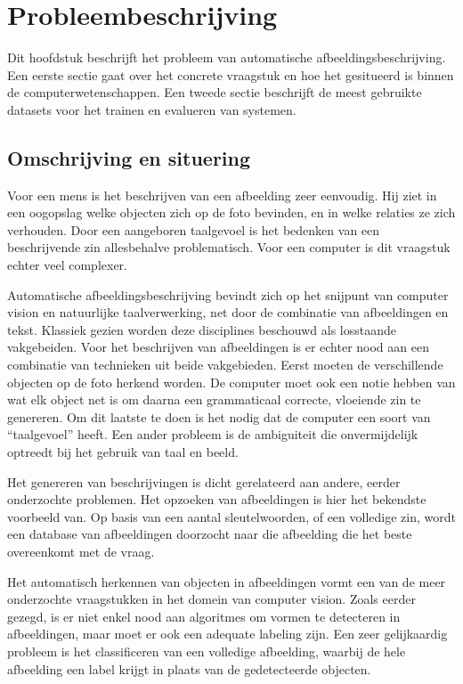 \chapter{Probleembeschrijving}
\label{chap:Probleembeschrijving}

Dit hoofdstuk beschrijft het probleem van automatische afbeeldingsbeschrijving. Een eerste sectie gaat over het concrete vraagstuk en hoe het gesitueerd is binnen de computerwetenschappen. Een tweede sectie beschrijft de meest gebruikte datasets voor het trainen en evalueren van systemen.

\section{Omschrijving en situering}
\label{sec:Omschrijving en situering}
Voor een mens is het beschrijven van een afbeelding zeer eenvoudig. Hij ziet in een oogopslag welke objecten zich op de foto bevinden, en in welke relaties ze zich verhouden. Door een aangeboren taalgevoel is het bedenken van een beschrijvende zin allesbehalve problematisch.
Voor een computer is dit vraagstuk echter veel complexer.

Automatische afbeeldingsbeschrijving bevindt zich op het snijpunt van computer vision en natuurlijke taalverwerking, net door de combinatie van afbeeldingen en tekst. Klassiek gezien worden deze disciplines beschouwd als losstaande vakgebeiden. Voor het beschrijven van afbeeldingen is er echter nood aan een combinatie van technieken uit beide vakgebieden. Eerst moeten de verschillende objecten op de foto herkend worden. De computer moet ook een notie hebben van wat elk object net is om daarna een grammaticaal correcte, vloeiende zin te genereren. Om dit laatste te doen is het nodig dat de computer een soort van ``taalgevoel'' heeft. Een ander probleem is de ambiguiteit die onvermijdelijk optreedt bij het gebruik van taal en beeld.

Het genereren van beschrijvingen is dicht gerelateerd aan andere, eerder onderzochte problemen. Het opzoeken van afbeeldingen is hier het bekendste voorbeeld van. Op basis van een aantal sleutelwoorden, of een volledige zin, wordt een database van afbeeldingen doorzocht naar die afbeelding die het beste overeenkomt met de vraag.

Het automatisch herkennen van objecten in afbeeldingen vormt een van de meer onderzochte vraagstukken in het domein van computer vision. Zoals eerder gezegd, is er niet enkel nood aan algoritmes om vormen te detecteren in afbeeldingen, maar moet er ook een adequate labeling zijn. Een zeer gelijkaardig probleem is het classificeren van een volledige afbeelding, waarbij de hele afbeelding een label krijgt in plaats van de gedetecteerde objecten. 


